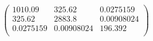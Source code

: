 \documentclass{article}
\begin{document}
\[\left(
\begin{array}{ccc}
 1010.09 & 325.62 & 0.0275159 \\
 325.62 & 2883.8 & 0.00908024 \\
 0.0275159 & 0.00908024 & 196.392 \\
\end{array}
\right)\]
\end{document}
